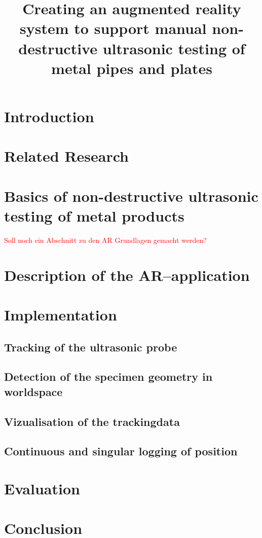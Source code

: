 \documentclass{VRARWorkshop}
\title{Creating an augmented reality system to support manual non-destructive ultrasonic testing of metal pipes and plates}
\begin{document}
\section{Introduction}

\section{Related Research}
\cite{ARPat15}
\cite{ARClean}
\cite{schwerdtfeger_using_2008}
\cite{fadzil_design_2015}
\cite{walter_non-contact_2007}

\section{Basics of non-destructive ultrasonic testing of metal products}
\cite{deutsch_zfp_2010}
\cite{moles_introduction_2004}
\cite{olympus_Grundlagen}

\textcolor{red}{Soll noch ein Abschnitt zu den AR Grundlagen gemacht werden?}

\section{Description of the AR--application}

\section{Implementation}
\cite{dorner_virtual_2013}

\subsection{Tracking of the ultrasonic probe}

\subsection{Detection of the specimen geometry in worldspace}

\subsection{Vizualisation of the trackingdata}

\subsection{Continuous and singular logging of position}

\section{Evaluation}

\section{Conclusion}

\VRARsetbibstyle

\end{document}
